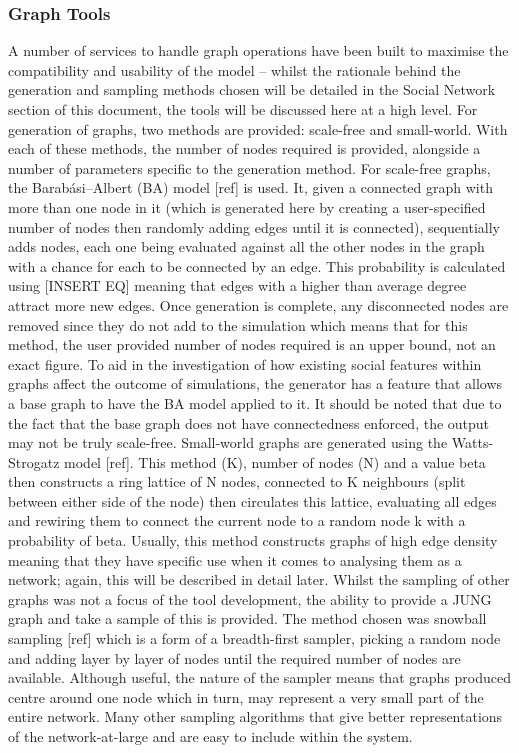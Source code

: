 \documentclass[]{report}
\begin{document}
\subsubsection{Graph Tools}
A number of services to handle graph operations have been built to maximise the compatibility and usability of the model – whilst the rationale behind the generation and sampling methods chosen will be detailed in the Social Network section of this document, the tools will be discussed here at a high level.
For generation of graphs, two methods are provided: scale-free and small-world. With each of these methods, the number of nodes required is provided, alongside a number of parameters specific to the generation method. For scale-free graphs, the Barabási–Albert (BA) model [ref] is used. It, given a connected graph with more than one node in it (which is generated here by creating a user-specified number of nodes then randomly adding edges until it is connected), sequentially adds nodes, each one being evaluated against all the other nodes in the graph with a chance for each to be connected by an edge. This probability is calculated using [INSERT EQ] meaning that edges with a higher than average degree attract more new edges. Once generation is complete, any disconnected nodes are removed since they do not add to the simulation which means that for this method, the user provided number of nodes required is an upper bound, not an exact figure. To aid in the investigation of how existing social features within graphs affect the outcome of simulations, the generator has a feature that allows a base graph to have the BA model applied to it. It should be noted that due to the fact that the base graph does not have connectedness enforced, the output may not be truly scale-free.
Small-world graphs are generated using the Watts-Strogatz model [ref]. This method (K), number of nodes (N) and a value beta then constructs a ring lattice of N nodes, connected to K neighbours (split between either side of the node) then circulates this lattice, evaluating all edges and rewiring them to connect the current node to a random node k with a probability of beta. Usually, this method constructs graphs of high edge density meaning that they have specific use when it comes to analysing them as a network; again, this will be described in detail later. 
Whilst the sampling of other graphs was not a focus of the tool development, the ability to provide a JUNG graph and take a sample of this is provided. The method chosen was snowball sampling [ref] which is a form of a breadth-first sampler, picking a random node and adding layer by layer of nodes until the required number of nodes are available. Although useful, the nature of the sampler means that graphs produced centre around one node which in turn, may represent a very small part of the entire network. Many other sampling algorithms that give better representations of the network-at-large and are easy to include within the system.
\end{document}
